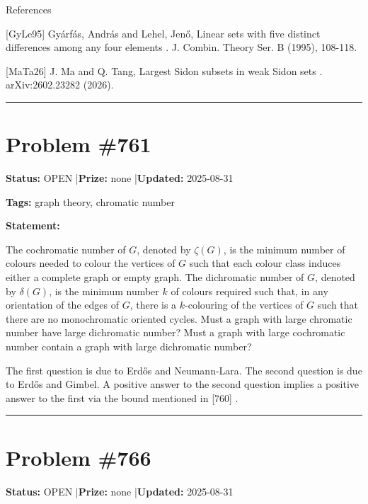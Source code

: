 \documentclass{article}
\begin{document}
References

[GyLe95] Gy\'{a}rf\'{a}s, Andr\'{a}s and Lehel, Jen\H{o}, Linear sets with five distinct differences among any four elements . J. Combin. Theory Ser. B (1995), 108-118.

[MaTa26] J. Ma and Q. Tang, Largest Sidon subsets in weak Sidon sets . arXiv:2602.23282 (2026).

\noindent\rule{\linewidth}{0.4pt}


\section{Problem \#761}
\label{prob:761}

\noindent\textbf{Status:} OPEN \quad|\quad \textbf{Prize:} none \quad|\quad \textbf{Updated:} 2025-08-31

\noindent\textbf{Tags:} graph theory, chromatic number

\medskip

\noindent\textbf{Statement:}

The cochromatic number of $G$, denoted by $\zeta(G)$, is the minimum number of colours needed to colour the vertices of $G$ such that each colour class induces either a complete graph or empty graph. The dichromatic number of $G$, denoted by $\delta(G)$, is the minimum number $k$ of colours required such that, in any orientation of the edges of $G$, there is a $k$-colouring of the vertices of $G$ such that there are no monochromatic oriented cycles. Must a graph with large chromatic number have large dichromatic number? Must a graph with large cochromatic number contain a graph with large dichromatic number?




The first question is due to Erd\H{o}s and Neumann-Lara. The second question is due to Erd\H{o}s and Gimbel. A positive answer to the second question implies a positive answer to the first via the bound mentioned in [760] .

\noindent\rule{\linewidth}{0.4pt}


\section{Problem \#766}
\label{prob:766}

\noindent\textbf{Status:} OPEN \quad|\quad \textbf{Prize:} none \quad|\quad \textbf{Updated:} 2025-08-31
\end{document}

